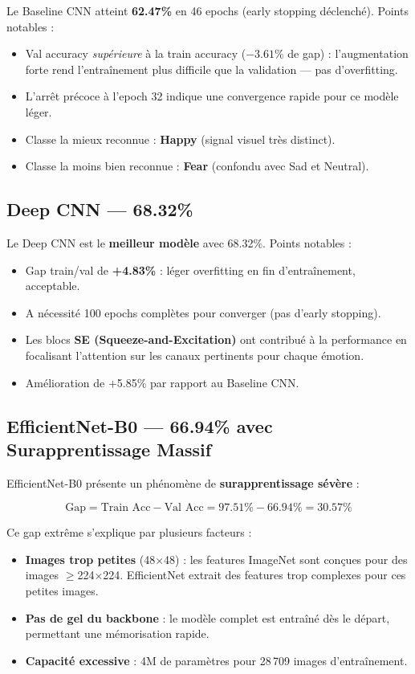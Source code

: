 \documentclass[12pt,a4paper]{article}
\begin{document}
Le Baseline CNN atteint \textbf{62.47\%} en 46 epochs (early stopping déclenché). Points notables :
\begin{itemize}
    \item Val accuracy \textit{supérieure} à la train accuracy ($-3.61\%$ de gap) : l'augmentation forte rend l'entraînement plus difficile que la validation --- pas d'overfitting.
    \item L'arrêt précoce à l'epoch 32 indique une convergence rapide pour ce modèle léger.
    \item Classe la mieux reconnue : \textbf{Happy} (signal visuel très distinct).
    \item Classe la moins bien reconnue : \textbf{Fear} (confondu avec Sad et Neutral).
\end{itemize}

\subsection{Deep CNN — 68.32\%}

Le Deep CNN est le \textbf{meilleur modèle} avec 68.32\%. Points notables :
\begin{itemize}
    \item Gap train/val de \textbf{+4.83\%} : léger overfitting en fin d'entraînement, acceptable.
    \item A nécessité 100 epochs complètes pour converger (pas d'early stopping).
    \item Les blocs \textbf{SE (Squeeze-and-Excitation)} ont contribué à la performance en focalisant l'attention sur les canaux pertinents pour chaque émotion.
    \item Amélioration de +5.85\% par rapport au Baseline CNN.
\end{itemize}

\subsection{EfficientNet-B0 — 66.94\% avec Surapprentissage Massif}

EfficientNet-B0 présente un phénomène de \textbf{surapprentissage sévère} :

\[
\text{Gap} = \text{Train Acc} - \text{Val Acc} = 97.51\% - 66.94\% = \mathbf{30.57\%}
\]

Ce gap extrême s'explique par plusieurs facteurs :
\begin{itemize}
    \item \textbf{Images trop petites} (48$\times$48) : les features ImageNet sont conçues pour des images $\geq$224$\times$224. EfficientNet extrait des features trop complexes pour ces petites images.
    \item \textbf{Pas de gel du backbone} : le modèle complet est entraîné dès le départ, permettant une mémorisation rapide.
    \item \textbf{Capacité excessive} : 4M de paramètres pour 28\,709 images d'entraînement.
\end{itemize}
\end{document}
